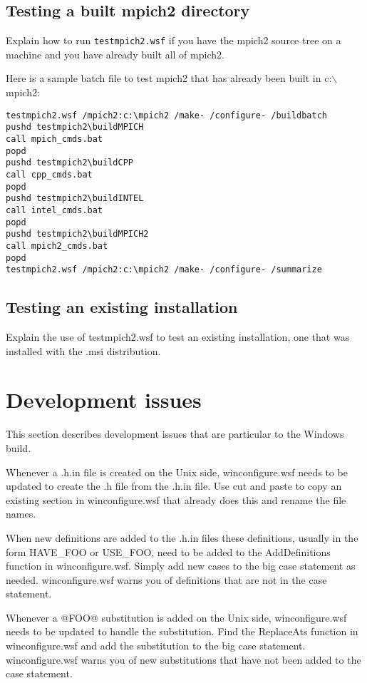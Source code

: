 \documentclass[dvipdfm,11pt]{article}
\begin{document}
\subsection{Testing a built mpich2 directory}
Explain how to run \texttt{testmpich2.wsf} if you have the mpich2 source tree on a machine and you 
have already built all of mpich2.

Here is a sample batch file to test mpich2 that has already been built in c:$\backslash$mpich2:
\begin{verbatim}
testmpich2.wsf /mpich2:c:\mpich2 /make- /configure- /buildbatch
pushd testmpich2\buildMPICH
call mpich_cmds.bat
popd
pushd testmpich2\buildCPP
call cpp_cmds.bat
popd
pushd testmpich2\buildINTEL
call intel_cmds.bat
popd
pushd testmpich2\buildMPICH2
call mpich2_cmds.bat
popd
testmpich2.wsf /mpich2:c:\mpich2 /make- /configure- /summarize
\end{verbatim}

\subsection{Testing an existing installation}
Explain the use of testmpich2.wsf to test an existing installation, one that was installed
with the .msi distribution.

\section{Development issues}
This section describes development issues that are particular to the Windows build.

Whenever a .h.in file is created on the Unix side, winconfigure.wsf needs to be updated to
create the .h file from the .h.in file.  Use cut and paste to copy an existing section in 
winconfigure.wsf that already does this and rename the file names.

When new definitions are added to the .h.in files these definitions, usually in the form HAVE\_FOO 
or USE\_FOO, need to be added to the AddDefinitions function in winconfigure.wsf.  Simply add 
new cases to the big case statement as needed.  winconfigure.wsf warns you of definitions that 
are not in the case statement.

Whenever a @FOO@ substitution is added on the Unix side, winconfigure.wsf needs to be updated
to handle the substitution.  Find the ReplaceAts function in winconfigure.wsf and add the 
substitution to the big case statement.  winconfigure.wsf warns you of new substitutions that
have not been added to the case statement.
\end{document}
